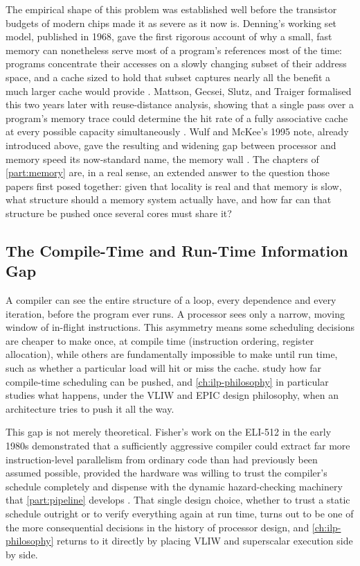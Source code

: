 \documentclass[11pt,a4paper]{report}
\begin{document}
The empirical shape of this problem was established well before the
transistor budgets of modern chips made it as severe as it now is.
Denning's working set model, published in 1968, gave the first rigorous
account of why a small, fast memory can nonetheless serve most of a
program's references most of the time: programs concentrate their
accesses on a slowly changing subset of their address space, and a cache
sized to hold that subset captures nearly all the benefit a much larger
cache would provide \cite{denning1968}. Mattson, Gecsei, Slutz, and
Traiger formalised this two years later with reuse-distance analysis,
showing that a single pass over a program's memory trace could
determine the hit rate of a fully associative cache at every possible
capacity simultaneously \cite{mattson1970}. Wulf and McKee's 1995 note,
already introduced above, gave the resulting and widening gap between
processor and memory speed its now-standard name, the memory wall
\cite{wulfmckee1995}. The chapters of \cref{part:memory} are, in a
real sense, an extended answer to the question those papers first posed
together: given that locality is real and that memory is slow, what
structure should a memory system actually have, and how far can that
structure be pushed once several cores must share it?

\subsection{The Compile-Time and Run-Time Information Gap}
A compiler can see the entire structure of a loop, every dependence and
every iteration, before the program ever runs. A processor sees only a
narrow, moving window of in-flight instructions. This asymmetry means
some scheduling decisions are cheaper to make once, at compile time
(instruction ordering, register allocation), while others are
fundamentally impossible to make until run time, such as whether a
particular load will hit or miss the cache.
 study how far
compile-time scheduling can be pushed, and \cref{ch:ilp-philosophy} in
particular studies what happens, under the VLIW and EPIC design
philosophy, when an architecture tries to push it all the way.

This gap is not merely theoretical. Fisher's work on the ELI-512 in the
early 1980s demonstrated that a sufficiently aggressive compiler could
extract far more instruction-level parallelism from ordinary code than
had previously been assumed possible, provided the hardware was willing
to trust the compiler's schedule completely and dispense with the
dynamic hazard-checking machinery that \cref{part:pipeline} develops
\cite{fisher1983}. That single design choice, whether to trust a static
schedule outright or to verify everything again at run time, turns out
to be one of the more consequential decisions in the history of
processor design, and \cref{ch:ilp-philosophy} returns to it directly by
placing VLIW and superscalar execution side by side.
\end{document}
